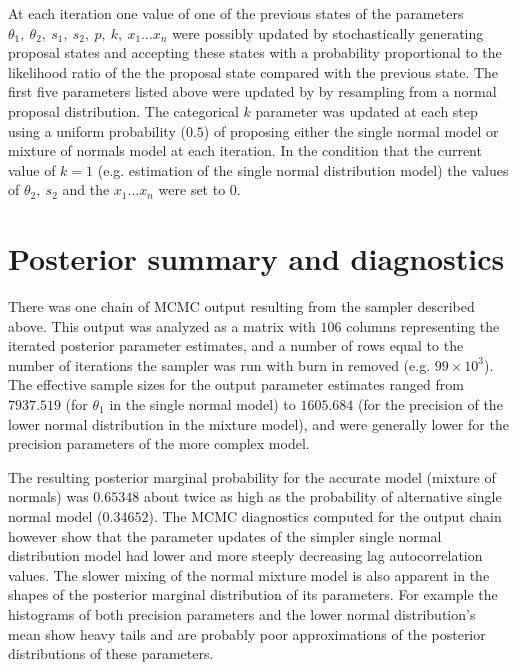 \documentclass[12pt]{article}
\begin{document}
At each iteration one value of one of the previous states of the parameters $\theta_1, \ \theta_2, \ s_1, \ s_2, \ p, \ k, \ x_1 \ldots x_n $ were possibly updated by stochastically generating proposal states and accepting these states with a probability proportional to the likelihood ratio of the the proposal state compared with the previous state. The first five parameters listed above were updated by by resampling from a normal proposal distribution. The categorical $k$ parameter was updated at each step using a uniform probability ($0.5$) of proposing either the single normal model or mixture of normals model at each iteration. In the condition that the current value of $k = 1$ (e.g. estimation of the single normal distribution model) the values of $\theta_2, \ s_2$ and the $x_1 \ldots x_n$ were set to 0. 


\section*{Posterior summary and diagnostics}

There was one chain of MCMC output resulting from the sampler described above. This output was analyzed as a matrix with $106$ columns representing the iterated posterior parameter estimates, and a number of rows  equal to the number of iterations the sampler was run with burn in removed (e.g. $99\times10^3$). 
The effective sample sizes for the output parameter estimates ranged from $7937.519$ (for $\theta_1$ in the single normal model) to $1605.684$ (for the precision of the lower normal distribution in the mixture model), and were generally lower for the precision parameters of the more complex model.

The resulting posterior marginal probability for the accurate model (mixture of normals) was $0.65348$ about twice as high as the probability of alternative single normal model ($0.34652$).  The MCMC diagnostics computed for the output chain however show that the parameter updates of the simpler single normal distribution model had lower and more steeply decreasing lag autocorrelation values. The slower mixing of the normal mixture model is also apparent in the shapes of the posterior marginal distribution of its parameters. For example the histograms of both precision parameters and the lower normal distribution's mean show heavy tails and are probably poor approximations of the posterior distributions of these parameters.
\end{document}
